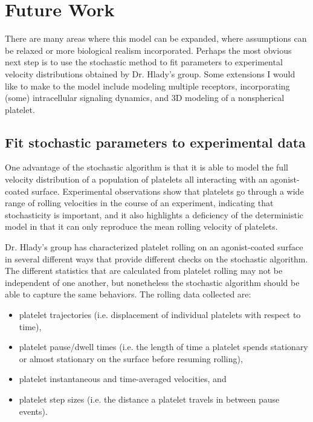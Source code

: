 
\chapter{Future Work}
\label{cha:future-work}

There are many areas where this model can be expanded, where
assumptions can be relaxed or more biological realism
incorporated. Perhaps the most obvious next step is to use the
stochastic method to fit parameters to experimental velocity
distributions obtained by Dr. Hlady's group. Some extensions I would like
to make to the model include modeling multiple receptors,
incorporating (some) intracellular signaling dynamics, and 3D modeling
of a nonspherical platelet. 

\section{Fit stochastic parameters to experimental data}
\label{sec:fit-stoch-param}

One advantage of the stochastic algorithm is that it is able to
model the full velocity distribution of a population of platelets all
interacting with an agonist-coated surface. Experimental observations
show that platelets go through a wide range of rolling velocities in
the course of an experiment, indicating that stochasticity is
important, and it also highlights a deficiency of the deterministic
model in that it can only reproduce the mean rolling velocity of
platelets.

Dr. Hlady's group has characterized platelet rolling on an
agonist-coated surface in several different ways that provide
different checks on the stochastic algorithm. The different statistics
that are calculated from platelet rolling may not be independent
of one another, but nonetheless the stochastic algorithm should be
able to capture the same behaviors. The rolling data collected are:
\begin{itemize}
\item platelet trajectories (i.e. displacement of individual platelets
  with respect to time),
\item platelet pause/dwell times (i.e. the length of time a platelet
  spends stationary or almost stationary on the surface before
  resuming rolling),
\item platelet instantaneous and time-averaged velocities, and
\item platelet step sizes (i.e. the distance a platelet travels in
  between pause events).
\end{itemize}

